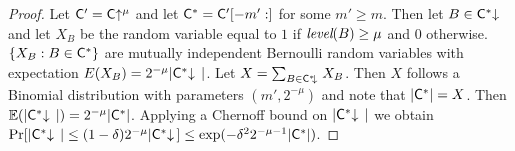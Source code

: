 \begin{proof}
Let $\mathsf{C}' = \mathsf{C}\negthickspace\uparrow^\mu$ and let $\mathsf{C}^* =
\mathsf{C}'[-m':]$ for some $m' \geq m$. Then let $B \in \mathsf{C}^*\negthickspace\downarrow\,$ and let
$X_B$ be the random variable equal to $1$ if $\emph{level}(B) \geq \mu$ and
$0$ otherwise. $\{ X_B: B \in \mathsf{C}^* \}$ are mutually independent Bernoulli
random variables with expectation $E(X_B) = 2^{-\mu}|\mathsf{C}^*\negthickspace\downarrow\,|$. Let
$X = \sum_{B \in \mathsf{C}^*\negthickspace\downarrow\,}{X_B}$. Then $X$ follows a Binomial
distribution with parameters $(m', 2^{-\mu})$ and note that $|\mathsf{C}^*| = X$.
Then $\mathbb{E}(|\mathsf{C}^*\negthickspace\downarrow\,|) = 2^{-\mu}|\mathsf{C}^*|$. Applying a Chernoff bound on
$|\mathsf{C}^*\negthickspace\downarrow\,|$ we obtain
$\Pr[|\mathsf{C}^*\negthickspace\downarrow\,| \leq (1 - \delta)2^{-\mu}|\mathsf{C}^*\negthickspace\downarrow\,] \leq
\exp(-\delta^2 2^{-\mu-1}|\mathsf{C}^*|)$.
\end{proof}
